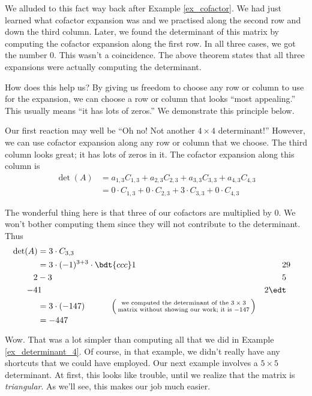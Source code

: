 We alluded to this fact way back after Example \ref{ex_cofactor}. We had just learned what cofactor expansion was and we practised along the second row and down the third column. Later, we found the determinant of this matrix by computing the cofactor expansion along the first row. In all three cases, we got the number 0. This wasn't a coincidence. The above theorem states that all three expansions were actually computing the determinant.

How does this help us? By giving us freedom to choose any row or column to use for the expansion, we can choose a row or column that looks ``most appealing.'' This usually means ``it has lots of zeros.'' We demonstrate this principle below.

\medskip

{
Our first reaction may well be ``Oh no! Not another $4\times 4$ determinant!'' However, we can use cofactor expansion along any row or column that we choose. The third column looks great; it has lots of zeros in it. The cofactor expansion along this column is
\begin{align*}
\det(A) & = a_{1,3}C_{1,3} + a_{2,3}C_{2,3} + a_{3,3}C_{3,3}+a_{4,3}C_{4,3} \\
	&= 0\cdot C_{1,3} + 0\cdot C_{2,3} + 3\cdot C_{3,3} + 0\cdot C_{4,3}
\end{align*}

The wonderful thing here is that three of our cofactors are multiplied by 0. We won't bother computing them since they will not contribute to the determinant. Thus 
\begin{align*}
\det(A) & = 3\cdot C_{3,3} \\
& = 3\cdot (-1)^{3+3}\cdot \bdt{ccc}1&2&9\\2&-3&5\\-4&1&2\edt \\
&= 3\cdot(-147) \quad\quad\quad \left(\parbox{160pt}{\centering\scriptsize we computed the determinant of the $3\times 3$ matrix without showing our work; it is $-147$}\right)\\
&= -447
\end{align*}
}

\medskip

Wow. That was a lot simpler than computing all that we did in Example \ref{ex_determinant_4}. Of course, in that example, we didn't really have any shortcuts that we could have employed. Our next example involves a $5\times 5$ determinant. At first, this looks like trouble, until we realize that the matrix is \textit{triangular}. As we'll see, this makes our job much easier.

